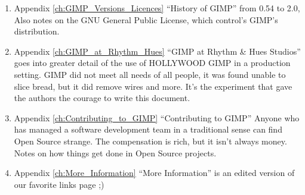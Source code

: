 \begin{enumerate}

\item Appendix  \ref{ch:GIMP_Versions_Licences} ``History of GIMP'' from
0.54 to 2.0, Also notes on the GNU General Public License, which
control's GIMP's distribution.

\item Appendix  \ref{ch:GIMP_at_Rhythm_Hues}  ``GIMP at Rhythm \& Hues Studios''
goes into greater detail of the use of HOLLYWOOD GIMP in a production
setting. GIMP did not meet all needs of all people, it was found unable to
slice bread, but it did remove wires and more. It's the experiment that gave the 
authors the courage to write this document.

\item Appendix \ref{ch:Contributing_to_GIMP} ``Contributing to GIMP''
Anyone who has managed a software development team in a traditional sense
can find Open Source strange. The compensation is rich, but it isn't always
money. Notes on how things get done in Open Source projects.

\item Appendix \ref{ch:More_Information} ``More Information'' is an
edited version of our favorite links page ;) \end{enumerate}
